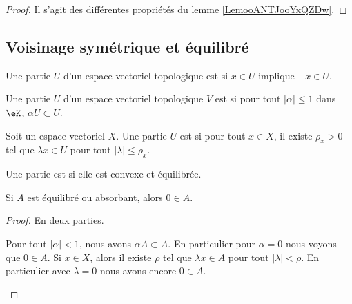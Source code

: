 \begin{proof}
	Il s'agit des différentes propriétés du lemme \ref{LemooANTJooYxQZDw}.
\end{proof}


\subsection{Voisinage symétrique et équilibré}

\begin{definition}		\label{DEFooKBMAooAhYQAm}
	Une partie \( U\) d'un espace vectoriel topologique est  si \( x\in U\) implique \( -x\in U\).
\end{definition}

\begin{definition}		\label{DEFooPNRIooEFAlii}
	Une partie \( U\) d'un espace vectoriel topologique \( V\) est  si pour tout \( | \alpha |\leq 1\) dans \( \eK\), \( \alpha U\subset U\).
\end{definition}

\begin{definition}		\label{DEFooMNZJooSIAVGZ}
	Soit un espace vectoriel \( X\). Une partie \( U\) est  si pour tout \( x\in X\), il existe \( \rho_x>0\) tel que \( \lambda x\in U\) pour tout \( | \lambda |\leq \rho_x\).
\end{definition}

\begin{definition} \label{DEFooYSWJooPkcrJe}
	Une partie est  si elle est convexe et équilibrée.
\end{definition}

\begin{lemma}		\label{LEMooXKOTooLWDXhp}
	Si \( A\) est équilibré ou absorbant, alors \( 0\in A\).
\end{lemma}

\begin{proof}
	En deux parties.
	\begin{subproof}
		Pour tout \( | \alpha |<1\), nous avons \( \alpha A\subset A\). En particulier pour \( \alpha=0\) nous voyons que \( 0\in A\).
		Si \( x\in X\), alors il existe \( \rho\) tel que \( \lambda x\in A\) pour tout \( | \lambda |<\rho\). En particulier avec \( \lambda=0\) nous avons encore \( 0\in A\).
	\end{subproof}
\end{proof}



